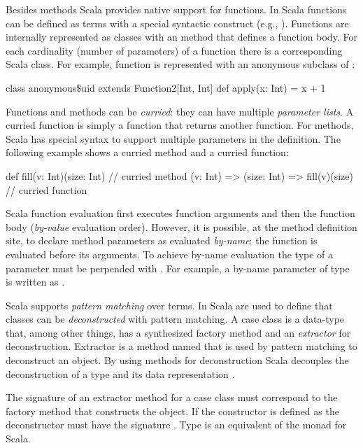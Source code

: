 Besides methods Scala provides native support for functions. In Scala functions can be defined
 as terms with a special syntactic construct (e.g., ). Functions
 are internally represented as classes with an  method that defines a function body.
 For each cardinality (number of parameters) of a function there is a corresponding
 Scala class. For example, function  is represented with an anonymous subclass
 of :\begin{lstparagraph}
class anonymous$\$$uid extends Function2[Int, Int] {
  def apply(x: Int) = x + 1
}
\end{lstparagraph}

Functions and methods can be \emph{curried}: they can have multiple \emph{parameter lists}.
 A curried function is simply a function that returns another function.
 For methods, Scala has special syntax to support multiple parameters in the definition.
 The following example shows a curried method and a curried function:\begin{lstparagraph}
def fill(v: Int)(size: Int) // curried method
(v: Int) => (size: Int) => fill(v)(size) // curried function
\end{lstparagraph}

Scala function evaluation first executes function arguments and then
 the function body (\emph{by-value} evaluation order). However, it is possible,
 at the method definition site, to declare method parameters as evaluated \emph{by-name}: the function
 is evaluated before its arguments. To achieve by-name evaluation the type of a parameter must be
 perpended with \code{=>}. For example, a by-name parameter of type  is written as
 .


Scala supports \emph{pattern matching} over terms. In Scala  are
used to define that classes can be \emph{deconstructed} with pattern matching. A case class is
a data-type that, among other things, has a synthesized factory method  and
an \emph{extractor} for deconstruction. Extractor is a method named  that
is used by pattern matching to deconstruct an object. By using
methods for deconstruction Scala decouples the deconstruction of a type and its
data representation \cite{emir2007matching}.

The signature of an extractor method for a case class must correspond to the factory method that
 constructs the object. If the constructor is defined as 
 the deconstructor must have the signature . Type 
 is an equivalent of the  monad for Scala.

